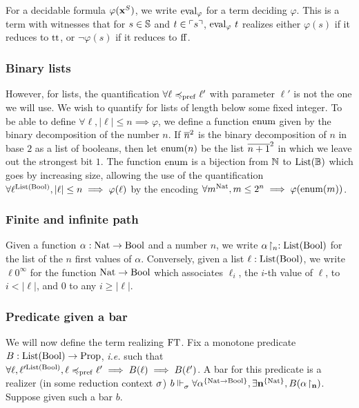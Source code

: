 \documentclass[a4paper,UKenglish,cleveref, autoref, thm-restate]{lipics-v2021}
\begin{document}
For a decidable formula $\varphi(\mathbf{x}^S)$, we write $\mathrm{eval}_\varphi$ for a term deciding $\varphi$. This is a term with witnesses that for $s \in \mathbb S$ and $t \in \ulcorner s\urcorner$, $\mathrm{eval}_\varphi\ t$ realizes either
$\varphi(s)$ if it reduces to $\mathrm{tt}$, or $\lnot\varphi(s)$ if it reduces to $\mathrm{ff}$.

\subsubsection{Binary lists}

However, for lists, the quantification $\forall \ell \preccurlyeq_{\mathrm{pref}} \ell'$ with parameter $\ell'$ is not the one we will use. We wish to quantify for lists of length below some fixed integer. To be able to define $\forall \ell, |\ell| \leq n \implies \varphi$, we define a function $\mathrm{enum}$ given by the binary decomposition of the number $n$. If $\overline{n}^{2}$ is the binary decomposition of $n$ in base $2$ as a list of booleans, then let $\mathrm{enum}(n)$ be the list $\overline{n+1}^{2}$ in which we leave out the strongest bit $1$. The function $\mathrm{enum}$ is a bijection from $\mathbb N$ to $\mathrm{List}(\mathbb B)$ which goes by increasing size, allowing the use of the quantification
$\forall \ell^{\mathrm{List}(\mathrm{Bool})}, |\ell| \leq n \implies \varphi(\ell)$
by the encoding
$\forall m^{\mathrm{Nat}}, m \leq 2^n \implies \varphi(\mathrm{enum}(m))$.

\subsubsection{Finite and infinite path}

Given a function $\alpha : \mathrm{Nat} \to \mathrm{Bool}$ and a number $n$, we write ${\alpha}\!\upharpoonright_{n} : \mathrm{List}(\mathrm{Bool})$ for the list of the $n$ first values of $\alpha$. Conversely, given a list $\ell : \mathrm{List}(\mathrm{Bool})$, we write $\ell0^\infty$ for the function $\mathrm{Nat} \to \mathrm{Bool}$ which associates $\ell_i$, the $i$-th value of $\ell$, to $i < |\ell|$, and $0$ to any $i \geq |\ell|$.





\subsubsection{Predicate given a bar}

We will now define the term realizing $\mathrm{FT}$.
Fix a monotone predicate $B : \mathrm{List}(\mathrm{Bool}) \to \mathrm{Prop}$, \textit{i.e.} such that
$\forall \ell, \ell'^{\mathrm{List}(\mathrm{Bool})}, \ell \preccurlyeq_{\mathrm{pref}} \ell' \implies B(\ell) \implies B(\ell')$.
A bar for this predicate is a realizer (in some reduction context $\sigma$)
$b \Vdash_{\sigma}^{} \forall \alpha^{\{\mathrm{Nat} \to \mathrm{Bool}\}}, \exists \mathbf{n}^{\{\mathrm{Nat}\}}, B({\alpha}\!\upharpoonright_{\mathbf{n}})$.
Suppose given such a bar $b$.
\end{document}
